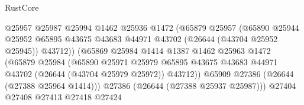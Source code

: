 \begin{lexlean}{RustCore}
\begin{coremodule}
                                            @25957
                                            @25987
                                            @25994
                                            @1462
                                            @25936
                                            @1472
                                            (@65879
                                              @25957
                                              (@65890
                                                @25944
                                                @25952
                                                @65895
                                                @43675
                                                @43683
                                                @44971
                                                @43702
                                                (@26644 (@43704 @25952 @25945))
                                                @43712))
                                            (@65869
                                              @25984
                                              @1414
                                              @1387
                                              @1462
                                              @25963
                                              @1472
                                              (@65879
                                                @25984
                                                (@65890
                                                  @25971
                                                  @25979
                                                  @65895
                                                  @43675
                                                  @43683
                                                  @44971
                                                  @43702
                                                  (@26644 (@43704 @25979 @25972))
                                                  @43712))
                                              @65909
                                              @27386
                                              (@26644 (@27388 @25964 @1414)))
                                            @27386
                                            (@26644 (@27388 @25937 @25987)))
                                          @27404
                                          @27408
                                          @27413
                                          @27418
                                          @27424

\end{coremodule}
\end{lexlean}
